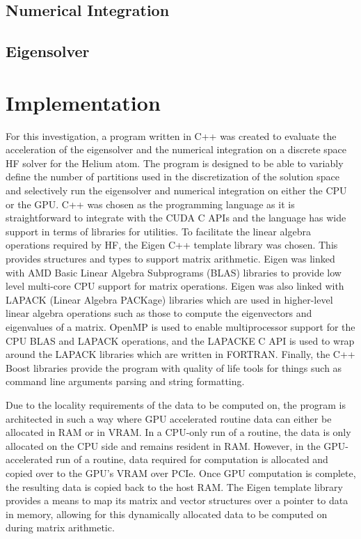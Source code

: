 \documentclass[conference, twoside]{IEEEtran}
\begin{document}
\subsection{Numerical Integration}

\subsection{Eigensolver}

\section{Implementation}

For this investigation, a program written in C++ was created to evaluate the acceleration of the eigensolver and the numerical integration on a discrete space HF solver for the Helium atom. The program is designed to be able to variably define the number of partitions used in the discretization of the solution space and selectively run the eigensolver and numerical integration on either the CPU or the GPU. C++ was chosen as the programming language as it is straightforward to integrate with the CUDA C APIs and the language has wide support in terms of libraries for utilities. To facilitate the linear algebra operations required by HF, the Eigen \cite{eigen} C++ template library was chosen. This provides structures and types to support matrix arithmetic. Eigen was linked with AMD Basic Linear Algebra Subprograms (BLAS) libraries \cite{amd-blas} to provide low level multi-core CPU support for matrix operations. Eigen was also linked with LAPACK (Linear Algebra PACKage) \cite{lapack} libraries which are used in higher-level linear algebra operations such as those to compute the eigenvectors and eigenvalues of a matrix. OpenMP is used to enable multiprocessor support for the CPU BLAS and LAPACK operations, and the LAPACKE C API is used to wrap around the LAPACK libraries which are written in FORTRAN. Finally, the C++ Boost libraries provide the program with quality of life tools for things such as command line arguments parsing and string formatting.

Due to the locality requirements of the data to be computed on, the program is architected in such a way where GPU accelerated routine data can either be allocated in RAM or in VRAM. In a CPU-only run of a routine, the data is only allocated on the CPU side and remains resident in RAM. However, in the GPU-accelerated run of a routine, data required for computation is allocated and copied over to the GPU's VRAM over PCIe. Once GPU computation is complete, the resulting data is copied back to the host RAM. The Eigen template library provides a means to map its matrix and vector structures over a pointer to data in memory, allowing for this dynamically allocated data to be computed on during matrix arithmetic.
\end{document}
